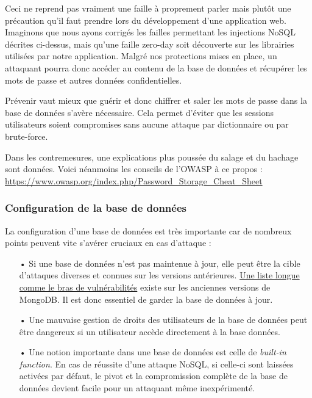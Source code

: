 \documentclass[12pt]{article}
\begin{document}
Ceci ne reprend pas vraiment une faille à proprement parler mais plutôt une précaution qu'il faut prendre lors du développement d'une application web. Imaginons que nous ayons corrigés les failles permettant les injections NoSQL décrites ci-dessus, mais qu'une faille zero-day soit découverte sur les librairies utilisées par notre application. Malgré nos protections mises en place, un attaquant pourra donc accéder au contenu de la base de données et récupérer les mots de passe et autres données confidentielles.

Prévenir vaut mieux que guérir et donc chiffrer et saler les mots de passe dans la base de données s'avère nécessaire. Cela permet d'éviter que les sessions utilisateurs soient compromises sans aucune attaque par dictionnaire ou par brute-force.

Dans les contremesures, une explications plus poussée du salage et du hachage sont données. Voici néanmoins les conseils de l'OWASP à ce propos : \url{https://www.owasp.org/index.php/Password_Storage_Cheat_Sheet}

\subsubsection{Configuration de la base de données}

La configuration d'une base de données est très importante car de nombreux points peuvent vite s'avérer cruciaux en cas d'attaque :

\begin{itemize}
\item[•] Si une base de données n'est pas maintenue à jour, elle peut être la cible d'attaques diverses et connues sur les versions antérieures. \href{https://www.cvedetails.com/vulnerability-list/vendor_id-12752/product_id-25450/Mongodb-Mongodb.html}{Une liste longue comme le bras de vulnérabilités} existe sur les anciennes versions de MongoDB. Il est donc essentiel de garder la base de données à jour.
\item[•] Une mauvaise gestion de droits des utilisateurs de la base de données peut être dangereux si un utilisateur accède directement à la base données.
\item[•] Une notion importante dans une base de données est celle de \emph{built-in function}. En cas de réussite d'une attaque NoSQL, si celle-ci sont laissées activées par défaut, le pivot et la compromission complète de la base de données devient facile pour un attaquant même inexpérimenté.
\end{itemize}
\end{document}
